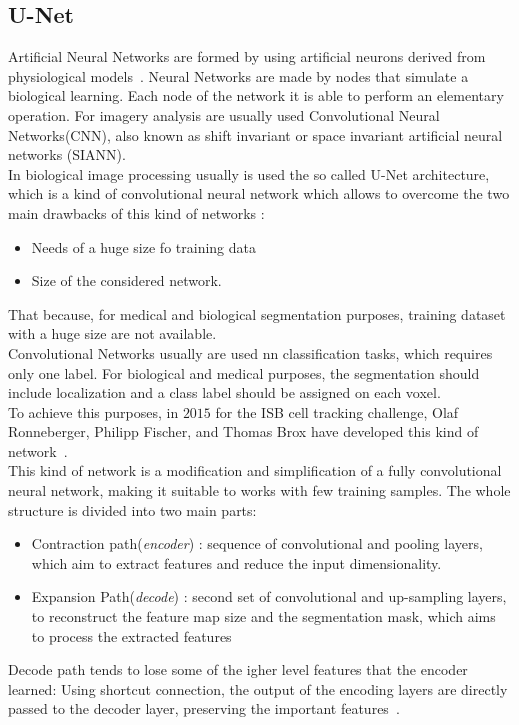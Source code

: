 \documentclass{standalone}
\begin{document}
		\subsection{U-Net}
		
		Artificial Neural Networks are formed by using artificial neurons derived from physiological models~\cite{INP:Withey}. Neural Networks are made by nodes that simulate a biological learning. Each node of the network it is able to perform an elementary operation.  For imagery analysis are usually used Convolutional Neural Networks(CNN), also known as shift invariant or space invariant artificial neural networks (SIANN).\\
			
		In biological image processing usually is used the  so called U-Net architecture, which is a kind of convolutional neural network which allows to overcome the two main drawbacks of this kind of networks :
		\begin{itemize}
			\item Needs of a huge size fo training data
			\item Size of the considered network. 
		\end{itemize}
	
		That because, for medical and biological segmentation purposes, training dataset with a huge size are not available.\\
		Convolutional Networks usually are used nn classification tasks, which requires only one label. For biological and medical purposes, the segmentation 	should include localization and a class label should be assigned on each voxel.\\
		To achieve this purposes, in $2015$ for the ISB cell tracking challenge, Olaf Ronneberger, Philipp Fischer, and Thomas Brox have developed this kind of network~\cite{ART:Johannes}. \\
		This kind of network is a modification and simplification of a fully convolutional neural network, making it suitable to works with few training samples.
		The whole structure is divided into two main parts:
		\begin{itemize}
			\item Contraction path(\textit{encoder}) : sequence of convolutional and pooling layers, which aim
			to extract features and reduce the input dimensionality. 
			
			\item Expansion Path(\textit{decode}) : second set of convolutional and up-sampling layers, to reconstruct the
			feature map size and the segmentation mask, which aims to process the extracted features
		\end{itemize}
		Decode path tends to lose some of the igher level features that the encoder learned: Using shortcut connection, the output of the encoding layers are directly passed to the decoder layer, preserving the important features~\cite{PhDtheis}.
	
\end{document}
